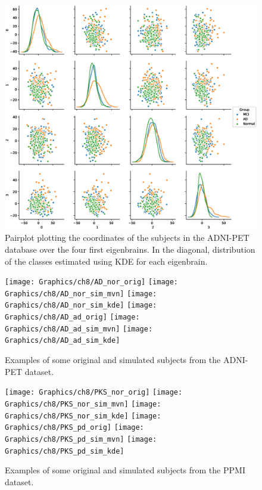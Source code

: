 \begin{figure}[h]
	\centering
	\includegraphics[width=\linewidth]{Graphics/ch8/Pairplot}
	\caption{Pairplot plotting the coordinates of the subjects in the ADNI-PET database over the four first eigenbrains. In the diagonal, distribution of the classes estimated using \acs{KDE} for each eigenbrain.}
	\label{fig:pairplot}
\end{figure}

\begin{figure}[h]
	\centering
	\texttt{[image: Graphics/ch8/AD\_nor\_orig]}
	\texttt{[image: Graphics/ch8/AD\_nor\_sim\_mvn]}
	\texttt{[image: Graphics/ch8/AD\_nor\_sim\_kde]}
	\texttt{[image: Graphics/ch8/AD\_ad\_orig]}
	\texttt{[image: Graphics/ch8/AD\_ad\_sim\_mvn]}
	\texttt{[image: Graphics/ch8/AD\_ad\_sim\_kde]}
	\caption{Examples of some original and simulated subjects from the ADNI-PET dataset.}
	\label{fig:samplesPET}
\end{figure}

\begin{figure}[h]
	\centering
	\texttt{[image: Graphics/ch8/PKS\_nor\_orig]}
	\texttt{[image: Graphics/ch8/PKS\_nor\_sim\_mvn]}
	\texttt{[image: Graphics/ch8/PKS\_nor\_sim\_kde]}
	\texttt{[image: Graphics/ch8/PKS\_pd\_orig]}
	\texttt{[image: Graphics/ch8/PKS\_pd\_sim\_mvn]}
	\texttt{[image: Graphics/ch8/PKS\_pd\_sim\_kde]}
	\caption{Examples of some original and simulated subjects from the PPMI dataset.}
	\label{fig:samplesDAT}
\end{figure}

